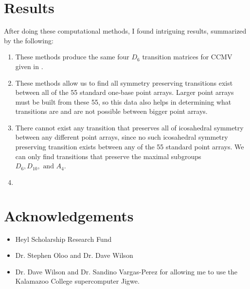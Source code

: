 \documentclass[a4paper,10pt]{article}
\theoremstyle{plain}
\theoremstyle{definition}
\theoremstyle{remark}
\begin{document}
\section{Results}
After doing these computational methods, I found intriguing results, summarized by the following:
\begin{enumerate}
	\item These methods produce the same four \( D_6 \) transition matrices for CCMV given in \cite{indelicatoetal2012}.
	
	\item These methods allow us to find all symmetry preserving transitions exist between all of the 55 standard one-base point arrays. Larger point arrays must be built from these 55, so this data also helps in determining what transitions are and are not possible between bigger point arrays.
	
	\item There cannot exist any transition that preserves all of icosahedral symmetry between any different point arrays, since no such icosahedral symmetry preserving transition exists between any of the 55 standard point arrays.
	We can only find transitions that preserve the maximal subgroups \(D_6, D_{10}, \text{ and } A_4\).
	
	\item {}
\end{enumerate}

\section{Acknowledgements}
\begin{itemize}
	\item Heyl Scholarship Research Fund
	\item Dr. Stephen Oloo and Dr. Dave Wilson
	\item Dr. Dave Wilson and Dr. Sandino Vargas-Perez for allowing me to use the Kalamazoo College supercomputer Jigwe.
\end{itemize}


\medskip

\end{document}
